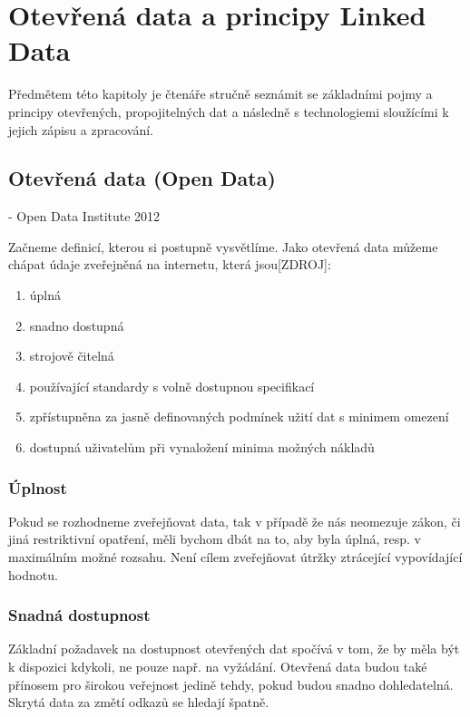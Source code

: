 \chapter{Otevřená data a principy Linked Data}

Předmětem této kapitoly je čtenáře stručně seznámit se základními pojmy a principy otevřených, propojitelných dat a následně s technologiemi sloužícími k jejich zápisu a zpracování.

\section{Otevřená data (Open Data)}

\textit{} - Open Data Institute 2012
\newline

Začneme definicí, kterou si postupně vysvětlíme. Jako otevřená data můžeme chápat údaje zveřejněná na internetu, která jsou[ZDROJ]:

\begin{enumerate}
\item úplná
\item snadno dostupná
\item strojově čitelná
\item používající standardy s volně dostupnou specifikací
\item zpřístupněna za jasně definovaných podmínek užití dat s minimem omezení
\item dostupná uživatelům při vynaložení minima možných nákladů
\end{enumerate}

\subsection*{Úplnost}

Pokud se rozhodneme zveřejňovat data, tak v případě že nás neomezuje zákon, či jiná restriktivní opatření, měli bychom dbát na to, aby byla úplná, resp. v maximálním možné rozsahu. Není cílem zveřejňovat útržky ztrácející vypovídající hodnotu.

\subsection*{Snadná dostupnost}

Základní požadavek na dostupnost otevřených dat spočívá v tom, že by měla být k dispozici kdykoli, ne pouze např. na vyžádání. Otevřená data budou také přínosem pro širokou veřejnost jedině tehdy, pokud budou snadno dohledatelná. Skrytá data za změtí odkazů se hledají špatně.

